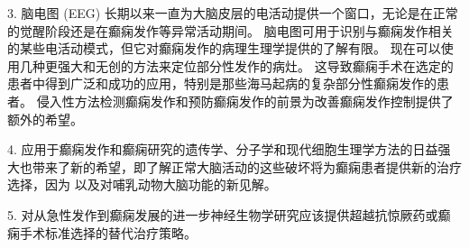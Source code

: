 3. 脑电图 (EEG) 长期以来一直为大脑皮层的电活动提供一个窗口，无论是在正常的觉醒阶段还是在癫痫发作等异常活动期间。
脑电图可用于识别与癫痫发作相关的某些电活动模式，但它对癫痫发作的病理生理学提供的了解有限。
现在可以使用几种更强大和无创的方法来定位部分性发作的病灶。
这导致癫痫手术在选定的患者中得到广泛和成功的应用，特别是那些海马起病的复杂部分性癫痫发作的患者。
侵入性方法检测癫痫发作和预防癫痫发作的前景为改善癫痫发作控制提供了额外的希望。


4. 应用于癫痫发作和癫痫研究的遗传学、分子学和现代细胞生理学方法的日益强大也带来了新的希望，即了解正常大脑活动的这些破坏将为癫痫患者提供新的治疗选择，因为 以及对哺乳动物大脑功能的新见解。


5. 对从急性发作到癫痫发展的进一步神经生物学研究应该提供超越抗惊厥药或癫痫手术标准选择的替代治疗策略。

